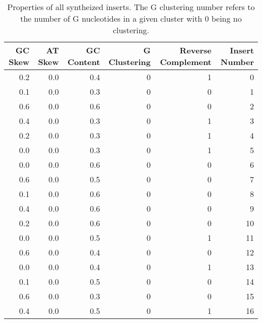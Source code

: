 \begin{table}
\centering
\caption{Properties of all syntheized inserts. The G clustering number refers to the number of G nucleotides in a given cluster with 0 being no clustering.}
\label{table:1}
\begin{tabular}{rrrrrr}
\toprule
 GC Skew &  AT Skew &  GC Content &  G Clustering &  Reverse Complement &  Insert Number \\
\midrule
     0.2 &      0.0 &         0.4 &             0 &                   1 &              0 \\
     0.1 &      0.0 &         0.3 &             0 &                   0 &              1 \\
     0.6 &      0.0 &         0.6 &             0 &                   0 &              2 \\
     0.4 &      0.0 &         0.3 &             0 &                   1 &              3 \\
     0.2 &      0.0 &         0.3 &             0 &                   1 &              4 \\
     0.0 &      0.0 &         0.3 &             0 &                   1 &              5 \\
     0.0 &      0.0 &         0.6 &             0 &                   0 &              6 \\
     0.6 &      0.0 &         0.5 &             0 &                   0 &              7 \\
     0.1 &      0.0 &         0.6 &             0 &                   0 &              8 \\
     0.4 &      0.0 &         0.6 &             0 &                   0 &              9 \\
     0.2 &      0.0 &         0.6 &             0 &                   0 &             10 \\
     0.0 &      0.0 &         0.5 &             0 &                   1 &             11 \\
     0.6 &      0.0 &         0.4 &             0 &                   0 &             12 \\
     0.0 &      0.0 &         0.4 &             0 &                   1 &             13 \\
     0.1 &      0.0 &         0.5 &             0 &                   0 &             14 \\
     0.6 &      0.0 &         0.3 &             0 &                   0 &             15 \\
     0.4 &      0.0 &         0.5 &             0 &                   1 &             16 \\

\end{tabular}
\end{table}
